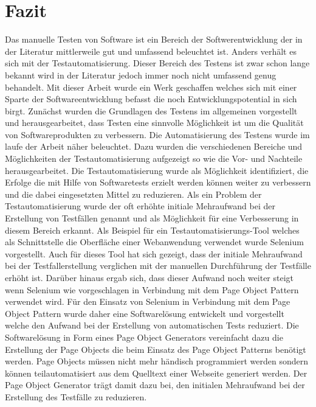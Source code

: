 \chapter{Fazit}
\label{sec:fazit}
Das manuelle Testen von Software ist ein Bereich der Softwerentwicklung der in der Literatur mittlerweile gut und umfassend beleuchtet ist. Anders verhält es sich mit der Testautomatisierung. Dieser Bereich des Testens ist zwar schon lange bekannt wird in der Literatur jedoch immer noch nicht umfassend genug behandelt. Mit dieser Arbeit wurde ein Werk geschaffen welches sich mit einer Sparte der Softwareentwicklung befasst die noch Entwicklungspotential in sich birgt. 
Zunächst wurden die Grundlagen des Testens im allgemeinen vorgestellt und herausgearbeitet, dass Testen eine sinnvolle Möglichkeit ist um die Qualität von Softwareprodukten zu verbessern. 
Die Automatisierung des Testens wurde im laufe der Arbeit näher beleuchtet. Dazu wurden die verschiedenen Bereiche und Möglichkeiten der Testautomatisierung aufgezeigt so wie die Vor- und Nachteile herausgearbeitet.
Die Testautomatisierung wurde als Möglichkeit identifiziert, die Erfolge die mit Hilfe von Softwaretests erzielt werden können weiter zu verbessern und die dabei eingesetzten Mittel zu reduzieren. Als ein Problem der Testautomatisierung wurde der oft erhöhte initiale Mehraufwand bei der Erstellung von Testfällen genannt und als Möglichkeit für eine Verbesserung in diesem Bereich erkannt.
Als Beispiel für ein Testautomatisierungs-Tool welches als Schnittstelle die Oberfläche einer Webanwendung verwendet wurde Selenium vorgestellt.
Auch für dieses Tool hat sich gezeigt, dass der initiale Mehraufwand bei der Testfallerstellung verglichen mit der manuellen Durchführung der Testfälle erhöht ist. Darüber hinaus ergab sich, dass dieser Aufwand noch weiter steigt wenn Selenium wie vorgeschlagen in Verbindung mit dem Page Object Pattern verwendet wird.
Für den Einsatz von Selenium in Verbindung mit dem Page Object Pattern wurde daher eine Softwarelösung entwickelt und vorgestellt welche den Aufwand bei der Erstellung von automatischen Tests reduziert.
Die Softwarelösung in Form eines Page Object Generators vereinfacht dazu die Erstellung der Page Objects die beim Einsatz des Page Object Patterns benötigt werden. Page Objects müssen nicht mehr händisch programmiert werden sondern können teilautomatisiert aus dem Quelltext einer Webseite generiert werden. Der Page Object Generator trägt damit dazu bei, den initialen Mehraufwand bei der Erstellung des Testfälle zu reduzieren.

